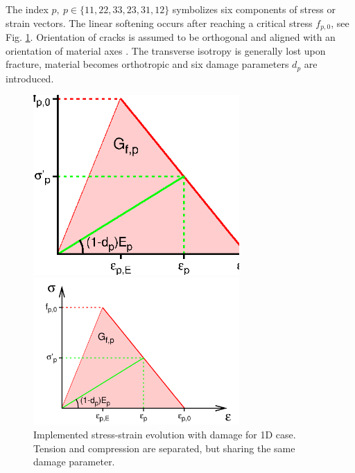 \documentclass[a4paper]{article}
\begin{document}
The index $p,~p\in\{11,22,33,23,31,12\}$ symbolizes six components of stress or strain vectors. The linear softening occurs after reaching a critical stress $f_{p,0}$, see Fig. \ref{comp_softening}. Orientation of cracks is assumed to be orthogonal and aligned with an orientation of material axes \cite[pp.236]{Bazant:98}. The transverse isotropy is generally lost upon fracture, material becomes orthotropic and six damage parameters $d_p$ are introduced.

\begin{figure}[!htb]
\begin{htmlonly}
  \centerline{\includegraphics[width=0.7\textwidth]{Compodamagemat_diag.eps}}
\end{htmlonly}
 \centerline{\includegraphics[width=0.7\textwidth]{Compodamagemat_diag}}
  \caption{Implemented stress-strain evolution with damage for 1D case. Tension and compression are separated, but sharing the same damage parameter.}
  \label{comp_softening}
\end{figure}
\end{document}
